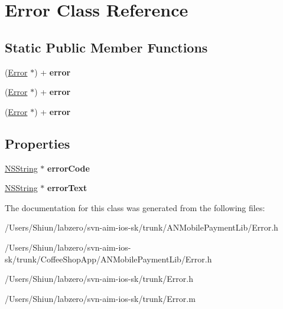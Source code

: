 \hypertarget{interface_error}{
\section{Error Class Reference}
\label{interface_error}
}
\subsection*{Static Public Member Functions}
\begin{DoxyCompactItemize}
\item 
\hypertarget{interface_error_ae8a5168615091a3c281db7a54a228fda}{
(\hyperlink{interface_error}{Error} $\ast$) + {\bfseries error}}
\label{interface_error_ae8a5168615091a3c281db7a54a228fda}

\item 
\hypertarget{interface_error_ae8a5168615091a3c281db7a54a228fda}{
(\hyperlink{interface_error}{Error} $\ast$) + {\bfseries error}}
\label{interface_error_ae8a5168615091a3c281db7a54a228fda}

\item 
\hypertarget{interface_error_ae8a5168615091a3c281db7a54a228fda}{
(\hyperlink{interface_error}{Error} $\ast$) + {\bfseries error}}
\label{interface_error_ae8a5168615091a3c281db7a54a228fda}

\end{DoxyCompactItemize}
\subsection*{Properties}
\begin{DoxyCompactItemize}
\item 
\hypertarget{interface_error_a2408df70503894d74fc00a2f198546cd}{
\hyperlink{class_n_s_string}{NSString} $\ast$ {\bfseries errorCode}}
\label{interface_error_a2408df70503894d74fc00a2f198546cd}

\item 
\hypertarget{interface_error_ab329b55e7d460b41750f37d533f51142}{
\hyperlink{class_n_s_string}{NSString} $\ast$ {\bfseries errorText}}
\label{interface_error_ab329b55e7d460b41750f37d533f51142}

\end{DoxyCompactItemize}


The documentation for this class was generated from the following files:\begin{DoxyCompactItemize}
\item 
/Users/Shiun/labzero/svn-\/aim-\/ios-\/sk/trunk/ANMobilePaymentLib/Error.h\item 
/Users/Shiun/labzero/svn-\/aim-\/ios-\/sk/trunk/CoffeeShopApp/ANMobilePaymentLib/Error.h\item 
/Users/Shiun/labzero/svn-\/aim-\/ios-\/sk/trunk/Error.h\item 
/Users/Shiun/labzero/svn-\/aim-\/ios-\/sk/trunk/Error.m\end{DoxyCompactItemize}
